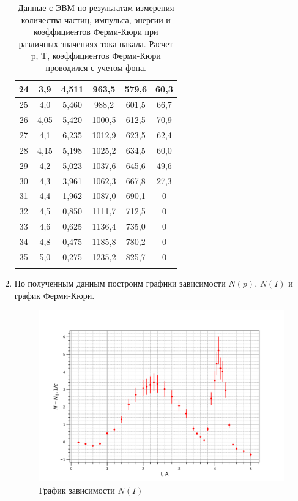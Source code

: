 \documentclass[a4paper, 12pt]{article}%
\begin{document}
\begin{enumerate}
\begin{longtable}{|c|c|c|c|c|c|}
			24  & 3,9   & 4,511  & 963,5     & 579,6   & 60,3  \\ \hline
			25  & 4,0   & 5,460  & 988,2     & 601,5   & 66,7  \\ \hline
			26  & 4,05  & 5,420  & 1000,5    & 612,5   & 70,9  \\ \hline
			27  & 4,1   & 6,235  & 1012,9    & 623,5   & 62,4  \\ \hline
			28  & 4,15  & 5,198  & 1025,2    & 634,5   & 60,0  \\ \hline
			29  & 4,2   & 5,023  & 1037,6    & 645,6   & 49,6  \\ \hline
			30  & 4,3   & 3,961  & 1062,3    & 667,8   & 27,3  \\ \hline
			31  & 4,4   & 1,962  & 1087,0    & 690,1   & 0     \\ \hline
			32  & 4,5   & 0,850  & 1111,7    & 712,5   & 0     \\ \hline
			33  & 4,6   & 0,625  & 1136,4    & 735,0   & 0     \\ \hline
			34  & 4,8   & 0,475  & 1185,8    & 780,2   & 0     \\ \hline
			35  & 5,0   & 0,275  & 1235,2    & 825,7   & 0     \\ \hline
			
			\caption{Данные с ЭВМ по результатам измерения количества частиц, импульса, энергии и коэффициентов Ферми-Кюри при различных значениях тока накала. Расчет p, T, коэффициентов Ферми-Кюри проводился с учетом фона.}
		\end{longtable}
		
		\item По полученным данным построим графики зависимости $N(p)$, $N(I)$ и график Ферми-Кюри.
		
		
		\begin{figure}[H]
			\includegraphics[scale=0.8]{N(I)}
			\centering
			\caption{График зависимости $N(I)$}
		\end{figure}
		

\end{enumerate}
\end{document}
